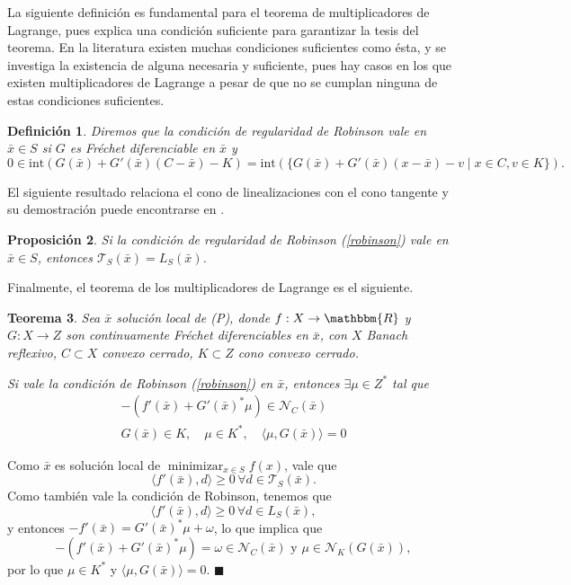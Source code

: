 \documentclass[a4paper,10pt]{book}
\newcommand{\R}{\mathbbm{R}}
\newcommand{\arr}{\rightarrow}
\newcommand{\bx}{\bar{x}}
\newcommand{\cN}{\mathcal{N}}
\newcommand{\cT}{\mathcal{T}}
\newcommand{\la}{\langle}
\newcommand{\ra}{\rangle}
\newtheorem{teo}{Teorema}%
\newtheorem{prop}[teo]{Proposici\'on}
\newtheorem{defi}[teo]{Definici\'on}
\newenvironment{dem}{\vspace*{-0.1cm}{\it Demostraci\'on:}}{\hfill
$\blacksquare$\\}
\begin{document}
La siguiente definición es fundamental para el teorema de multiplicadores de Lagrange, pues explica una condición suficiente para garantizar la tesis del teorema.
En la literatura existen muchas condiciones suficientes como ésta, y se investiga la existencia de alguna necesaria y suficiente, pues hay casos en los que existen multiplicadores de Lagrange a pesar de que no se cumplan ninguna de estas condiciones suficientes.
\begin{defi}
 Diremos que la condición de regularidad de Robinson vale en $\bx\in S$ si $G$ es Fréchet diferenciable en $\bx$ y 
 \begin{equation}\label{robinson}
0\in \mathrm{int}\left(G(\bx) + G'(\bx)(C-\bx)-K\right)=\mathrm{int}(\{G(\bx) + G'(\bx)(x-\bx)-v \mid x\in C , v\in K\}).
 \end{equation}
\end{defi} 

El siguiente resultado relaciona el cono de linealizaciones con el cono tangente y su demostración puede encontrarse en \cite[Corollary 2.91]{bonnans2013perturbation}.
\begin{prop}
 Si la condición de regularidad de Robinson (\ref{robinson}) vale en $\bx \in S$, entonces $\cT_S(\bx) = L_S(\bx)$.
\end{prop}

Finalmente, el teorema de los multiplicadores de Lagrange es el siguiente.

\begin{teo}\label{lagrinf}
Sea $\bx$ solución local de (P), donde $f:X\arr\R$ y $G:X\arr Z$ son continuamente Fréchet diferenciables en $\bx$, con $X$ Banach reflexivo, $C\subset X$ convexo cerrado, $K\subset Z$ cono convexo cerrado.

Si vale la condición de Robinson (\ref{robinson}) en $\bx$, entonces $\exists \mu\in Z^*$ tal que 
\begin{equation}\label{condOptim}
\begin{array}{c}
         -(f'(\bx) + G'(\bx)^*\mu)\in \cN_C(\bx)\\
          G(\bx)\in K,\quad \mu\in K^* ,\quad \langle\mu , G(\bx)\rangle = 0
         \end{array}
\end{equation}
\end{teo} 
\begin{dem}
Como $\bx$ es solución local de $\displaystyle \mathop{\mathrm{minimizar}}_{x\in S}\displaystyle f(x)$, vale que $$\la f'(\bx),d\ra\geq0\,\forall d\in\cT_S(\bx).$$ Como también vale la condición de Robinson, tenemos que $$\la f'(\bx),d\ra\geq0\,\forall d\in L_S(\bx),$$ y entonces $-f'(\bx)=G'(\bx)^*\mu+\omega$, lo que implica que $$-(f'(\bx)+G'(\bx)^*\mu)=\omega\in\cN_C(\bx)\mbox{ y }\mu\in\cN_K(G(\bx)),$$ por lo que $\mu\in K^*$ y $\la \mu,G(\bx)\ra=0$.
\end{dem}
\end{document}
